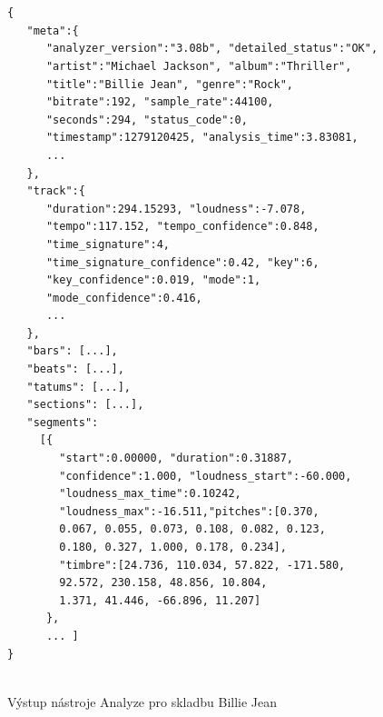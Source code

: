 \documentclass[thesis=M,czech]{FITthesis}[2012/06/26]
\begin{document}
\begin{listing}
\begin{verbatim}


{  
   "meta":{  
      "analyzer_version":"3.08b", "detailed_status":"OK",
      "artist":"Michael Jackson", "album":"Thriller",
      "title":"Billie Jean", "genre":"Rock",
      "bitrate":192, "sample_rate":44100,
      "seconds":294, "status_code":0,
      "timestamp":1279120425, "analysis_time":3.83081,
      ...
   },
   "track":{  
      "duration":294.15293, "loudness":-7.078,
      "tempo":117.152, "tempo_confidence":0.848,
      "time_signature":4,
      "time_signature_confidence":0.42, "key":6,
      "key_confidence":0.019, "mode":1,
      "mode_confidence":0.416,
      ...
   },
   "bars": [...],
   "beats": [...],
   "tatums": [...],
   "sections": [...],
   "segments":
     [{ 
        "start":0.00000, "duration":0.31887,
        "confidence":1.000, "loudness_start":-60.000,
        "loudness_max_time":0.10242,
        "loudness_max":-16.511,"pitches":[0.370,
        0.067, 0.055, 0.073, 0.108, 0.082, 0.123,
        0.180, 0.327, 1.000, 0.178, 0.234],
        "timbre":[24.736, 110.034, 57.822, -171.580,
        92.572, 230.158, 48.856, 10.804,
        1.371, 41.446, -66.896, 11.207]
      },
      ... ]
}


\end{verbatim}
\caption{Výstup nástroje Analyze pro skladbu Billie Jean} 
\label{json-example}
\end{listing}
\end{document}
